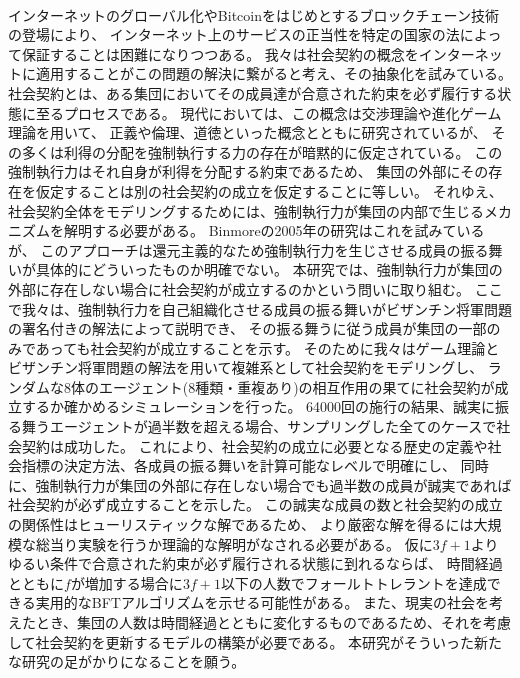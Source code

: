 ~ \\
  インターネットのグローバル化やBitcoin\cite{nakamoto2008bitcoin}をはじめとするブロックチェーン技術の登場により、
  インターネット上のサービスの正当性を特定の国家の法によって保証することは困難になりつつある。
  我々は社会契約の概念をインターネットに適用することがこの問題の解決に繋がると考え、その抽象化を試みている。
  社会契約とは、ある集団においてその成員達が合意された約束を必ず履行する状態に至るプロセスである。
  現代においては、この概念は交渉理論や進化ゲーム理論を用いて、
  正義や倫理、道徳といった概念とともに研究されている\cite{sep-game-ethics}が、
  その多くは利得の分配を強制執行する力の存在が暗黙的に仮定されている。
  この強制執行力はそれ自身が利得を分配する約束であるため、
  集団の外部にその存在を仮定することは別の社会契約の成立を仮定することに等しい。
  それゆえ、社会契約全体をモデリングするためには、強制執行力が集団の内部で生じるメカニズムを解明する必要がある。
  Binmoreの2005年の研究\cite{binmore2005}はこれを試みているが、
  このアプローチは還元主義的なため強制執行力を生じさせる成員の振る舞いが具体的にどういったものか明確でない。
  本研究では、強制執行力が集団の外部に存在しない場合に社会契約が成立するのかという問いに取り組む。
  ここで我々は、強制執行力を自己組織化させる成員の振る舞いがビザンチン将軍問題の署名付きの解法\cite{lamport1982}によって説明でき、
  その振る舞うに従う成員が集団の一部のみであっても社会契約が成立することを示す。
  そのために我々はゲーム理論とビザンチン将軍問題の解法を用いて複雑系として社会契約をモデリングし、
  ランダムな8体のエージェント(8種類・重複あり)の相互作用の果てに社会契約が成立するか確かめるシミュレーションを行った。
  64000回の施行の結果、誠実に振る舞うエージェントが過半数を超える場合、サンプリングした全てのケースで社会契約は成功した。
  これにより、社会契約の成立に必要となる歴史の定義や社会指標の決定方法、各成員の振る舞いを計算可能なレベルで明確にし、
  同時に、強制執行力が集団の外部に存在しない場合でも過半数の成員が誠実であれば社会契約が必ず成立することを示した。
  この誠実な成員の数と社会契約の成立の関係性はヒューリスティックな解であるため、
  より厳密な解を得るには大規模な総当り実験を行うか理論的な解明がなされる必要がある。
  仮に$3f+1$よりゆるい条件で合意された約束が必ず履行される状態に到れるならば、
  時間経過とともに$f$が増加する場合に$3f+1$以下の人数でフォールトトレラントを達成できる実用的なBFTアルゴリズムを示せる可能性がある。
  また、現実の社会を考えたとき、集団の人数は時間経過とともに変化するものであるため、それを考慮して社会契約を更新するモデルの構築が必要である。
  本研究がそういった新たな研究の足がかりになることを願う。
~ \\